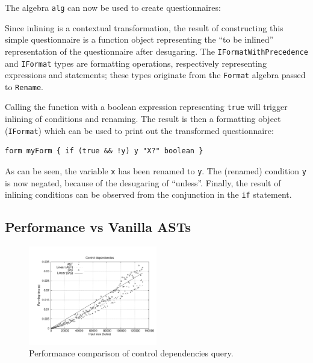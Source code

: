 The algebra \lstinline{alg} can now be used to create questionnaires:


Since inlining is a contextual transformation, the result of constructing this simple questionnaire is a function object representing the ``to be inlined'' representation of the questionnaire after desugaring.
The {\small\texttt{IFor\-mat\-With\-Pre\-cedence}} and \lstinline{IFormat} types are  formatting operations, respectively representing expressions and statements; these types originate from the \lstinline{Format} algebra passed to \lstinline{Rename}.

Calling the function with a boolean expression representing \lstinline{true} will trigger inlining of conditions and renaming. The result is then a formatting object (\lstinline{IFormat}) which can be used to print out the transformed questionnaire:

  \begin{lstlisting}[language=ql]
  form myForm { if (true && !y) y "X?" boolean }
  \end{lstlisting}

\noindent As can be seen, the variable \lstinline{x} has been renamed to \lstinline{y}.
The (renamed) condition \lstinline{y} is now negated, because of the desugaring of ``unless''.
Finally, the result of inlining conditions can be observed from the conjunction in the \lstinline[language=ql]{if} statement.


\subsection{\name Performance vs Vanilla ASTs}

\begin{figure}[t]
  \nocaptionrule
  \hspace*{-.03\textwidth}
  \includegraphics[width=0.5\textwidth]{plots/controldeps}
  \caption{Performance comparison of control dependencies query.\label{FIG:controlPerf}}
\end{figure}

